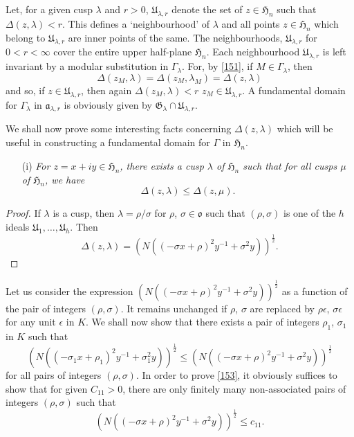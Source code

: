 Let, for a given cusp $\lambda$ and $r>0$, $\mathfrak{U}_{\lambda,r}$
denote the set of $z\in\mathfrak{H}_{n}$ such that
$\Delta(z,\lambda)<r$. This defines a `neighbourhood' of $\lambda$ and
all points $z\in\mathfrak{H}_{n}$ which belong to
$\mathfrak{U}_{\lambda,r}$ are inner points of the same. The
neighbourhoods, $\mathfrak{U}_{\lambda,r}$ for $0<r<\infty$ cover the
entire upper half-plane $\mathfrak{H}_{n}$. Each neighbourhood
$\mathfrak{U}_{\lambda,r}$ is left invariant by a modular substitution
in $\Gamma_{\lambda}$. For, by \eqref{151}, if $M\in\Gamma_{\lambda}$,
then
$$
\Delta (z_{M},\lambda)=\Delta(z_{M},\lambda_{M})=\Delta(z,\lambda)
$$
and so, if $z\in\mathfrak{U}_{\lambda,r}$, then again
$\Delta(z_{M},\lambda)<r$ \ie $z_{M}\in\mathfrak{U}_{\lambda,r}$. A
fundamental domain for $\Gamma_{\lambda}$ in
$\mathfrak{a}_{\lambda,r}$ is obviously given by
$\mathfrak{G}_{\lambda}\cap \mathfrak{U}_{\lambda,r}$.

We shall now prove some interesting facts concerning
$\Delta(z,\lambda)$ which will be useful in constructing a fundamental
domain for $\Gamma$ in $\mathfrak{H}_{n}$.
\begin{itemize}
\item[(i)] {\em For $z=x+iy\in \mathfrak{H}_{n}$, there exists a cusp
  $\lambda$ of $\mathfrak{H}_{n}$ such that for all cusps $\mu$ of
  $\mathfrak{H}_{n}$, we have}
\begin{equation*}
\Delta(z,\lambda)\leq \Delta(z,\mu).\tag{152}\label{152}
\end{equation*}
\end{itemize}

\begin{proof}
If $\lambda$ is a cusp, then $\lambda=\rho/\sigma$ for $\rho$,
$\sigma\in \mathfrak{o}$ such that $(\rho,\sigma)$ is one of the $h$
ideals $\mathfrak{U}_{1},\ldots,\mathfrak{U}_{h}$. Then
$$
\Delta(z,\lambda)=(N((-\sigma
x+\rho)^{2}y^{-1}+\sigma^{2}y))^{\frac{1}{2}}. 
$$
\end{proof}

Let us consider the expression $(N((-\sigma
x+\rho)^{2}y^{-1}+\sigma^{2}y))^{\frac{1}{2}}$ as a function of the
pair of integers $(\rho,\sigma)$. It remains unchanged if $\rho$,
$\sigma$ are replaced by $\rho\epsilon$, $\sigma\epsilon$ for any unit
$\epsilon$ in $K$. We shall now show that there exists a pair of
integers $\rho_{1}$, $\sigma_{1}$ in $K$ such that
\begin{equation*}
(N((-\sigma_{1}x+\rho_{1})^{2}y^{-1}+\sigma^{2}_{1}y))^{\frac{1}{2}}\leq
  (N((-\sigma x+\rho)^{2}y^{-1}+\sigma^{2}y))^{\frac{1}{2}}\tag{153}\label{153}
\end{equation*}\pageoriginale
for all pairs of integers $(\rho,\sigma)$. In order to prove
\eqref{153}, it obviously suffices to show that for given $C_{11}>0$,
there are only finitely many non-associated pairs of integers
$(\rho,\sigma)$ such that
\begin{equation*}
(N((-\sigma x+\rho)^{2}y^{-1}+\sigma^{2}y))^{\frac{1}{2}}\leq
  c_{11}.\tag{154}\label{154} 
\end{equation*}

